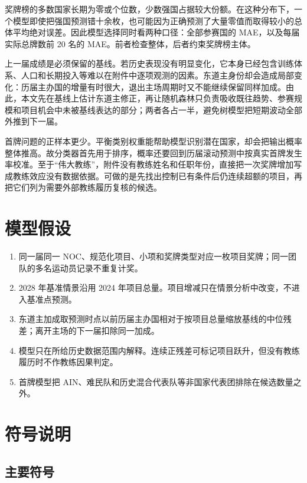 \documentclass[UTF8,11pt,a4paper]{ctexart}
\begin{document}
奖牌榜的多数国家长期为零或个位数，少数强国占据较大份额。在这种分布下，一个模型即使把强国预测错十余枚，也可能因为正确预测了大量零值而取得较小的总体平均绝对误差。因此模型选择同时看两种口径：全部参赛国的 MAE，以及每届实际总牌数前 20 名的 MAE。前者检查整体，后者约束奖牌榜主体。

上一届成绩是必须保留的基线。若历史表现没有明显变化，它本身已经包含训练体系、人口和长期投入等难以在附件中逐项观测的因素。东道主身份却会造成局部变化：历届主办国的增量有时很大，退出主场周期时又不能继续保留同样加成。由此，本文先在基线上估计东道主修正，再让随机森林只负责吸收既往趋势、参赛规模和项目机会中未被基线表达的部分；两者各占一半，避免树模型把短期波动全部外推到下一届。

首牌问题的正样本更少。平衡类别权重能帮助模型识别潜在国家，却会把输出概率整体推高。故分类器首先用于排序，概率还要回到历届滚动预测中按真实首牌发生率校准。至于“伟大教练”，附件没有教练姓名和任职年份，直接把一次奖牌增加写成教练效应没有数据依据。可做的是先找出控制已有条件后仍连续超额的项目，再把它们列为需要外部教练履历复核的候选。

\section{模型假设}

\begin{enumerate}[label=\arabic*)]
\item 同一届同一 NOC、规范化项目、小项和奖牌类型对应一枚项目奖牌；同一团队的多名运动员记录不重复计奖。
\item 2028 年基准情景沿用 2024 年项目总量。项目增减只在情景分析中改变，不进入基准点预测。
\item 东道主加成取预测时点以前历届主办国相对于按项目总量缩放基线的中位残差；离开主场的下一届扣除同一加成。
\item 模型只在所给历史数据范围内解释。连续正残差可标记项目跃升，但没有教练履历时不作教练因果判定。
\item 首牌模型把 AIN、难民队和历史混合代表队等非国家代表团排除在候选数量之外。
\end{enumerate}

\section{符号说明}

\subsection{主要符号}
\end{document}
